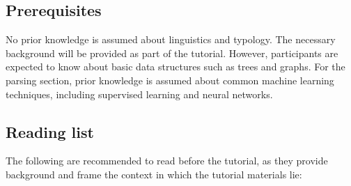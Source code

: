 \documentclass[11pt,a4paper,table]{article}
\begin{document}
\subsection{Prerequisites}\label{sec:prerequisites}

No prior knowledge is assumed about linguistics and typology.
The necessary background will be provided as part of the tutorial.
However, participants are expected to know about basic data structures
such as trees and graphs.
For the parsing section, prior knowledge is assumed about
common machine learning techniques, including supervised learning
and neural networks.

\subsection{Reading list}\label{sec:reading}

The following are recommended to read before the tutorial, as
they provide background and frame the context in which the tutorial
materials lie:
\end{document}
